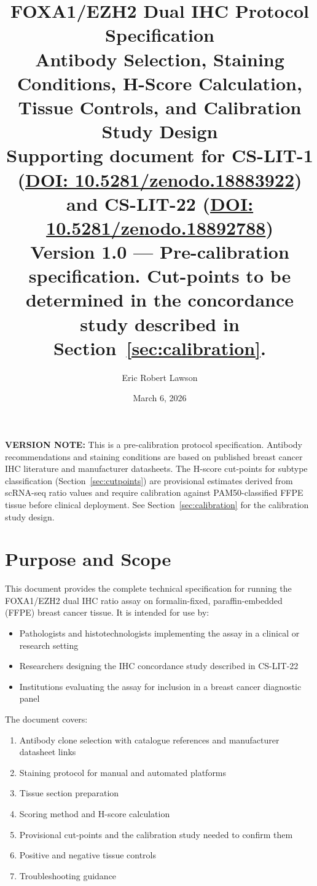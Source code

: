 \documentclass[11pt, a4paper]{article}
\title{
    \vspace{-1em}
    \textbf{FOXA1/EZH2 Dual IHC Protocol Specification}\\[0.5em]
    \large Antibody Selection, Staining Conditions,
    H-Score Calculation, Tissue Controls,
    and Calibration Study Design\\[0.4em]
    \normalsize Supporting document for
    CS-LIT-1 (\href{https://doi.org/10.5281/zenodo.18883922}
    {DOI: 10.5281/zenodo.18883922}) and
    CS-LIT-22 (\href{https://doi.org/10.5281/zenodo.18892788}
    {DOI: 10.5281/zenodo.18892788})\\[0.3em]
    \small Version 1.0 --- Pre-calibration specification.
    Cut-points to be determined in the concordance study
    described in Section~\ref{sec:calibration}.
}
\author[1]{Eric Robert Lawson}
\affil[1]{OrganismCore \textbar{}
    \href{mailto:OrganismCore@proton.me}
    {OrganismCore@proton.me} \textbar{}
    ORCID: 0009-0002-0414-6544}
\date{March 6, 2026}
\begin{document}
\maketitle
\thispagestyle{fancy}

\begin{mdframed}[backgroundcolor=warningbox,
                 linecolor=orange!70!black,
                 linewidth=1pt]
\textbf{VERSION NOTE:} This is a pre-calibration
protocol specification. Antibody recommendations
and staining conditions are based on published
breast cancer IHC literature and manufacturer
datasheets. The H-score cut-points for subtype
classification (Section~\ref{sec:cutpoints}) are
provisional estimates derived from scRNA-seq
ratio values and require calibration against
PAM50-classified FFPE tissue before clinical
deployment. See Section~\ref{sec:calibration}
for the calibration study design.
\end{mdframed}

\vspace{0.5em}

\tableofcontents

\newpage

\section{Purpose and Scope}

This document provides the complete technical
specification for running the FOXA1/EZH2 dual IHC
ratio assay on formalin-fixed, paraffin-embedded
(FFPE) breast cancer tissue. It is intended for
use by:

\begin{itemize}
    \item Pathologists and histotechnologists
    implementing the assay in a clinical or
    research setting
    \item Researchers designing the IHC
    concordance study described in CS-LIT-22
    \item Institutions evaluating the assay
    for inclusion in a breast cancer
    diagnostic panel
\end{itemize}

The document covers:
\begin{enumerate}
    \item Antibody clone selection with catalogue
    references and manufacturer datasheet links
    \item Staining protocol for manual and
    automated platforms
    \item Tissue section preparation
    \item Scoring method and H-score calculation
    \item Provisional cut-points and the
    calibration study needed to confirm them
    \item Positive and negative tissue controls
    \item Troubleshooting guidance
\end{enumerate}
\end{document}
